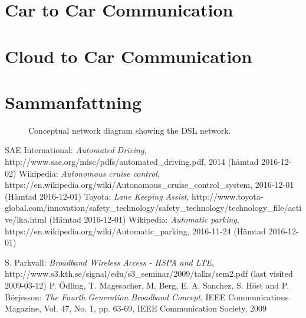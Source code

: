 \documentclass[a4paper]{IEEEtran}
\begin{document}
\section{Car to Car Communication}

\section{Cloud to Car Communication}

\section{Sammanfattning}



\begin{figure}
    \begin{center}
    \end{center}
    \caption{Conceptual network diagram showing the DSL network.}
    \label{DSLsetup}
\end{figure}




\begin{thebibliography}{77}
	SAE International: \emph{Automated Driving}, http://www.sae.org/misc/pdfs/automated\_driving.pdf, 2014 (hämtad 2016-12-02)
	Wikipedia: \emph{Autonomous cruise control}, https://en.wikipedia.org/wiki/Autonomous\_cruise\_control\_system, 2016-12-01 (Hämtad 2016-12-01)
	Toyota: \emph{Lane Keeping Assist}, 
	http://www.toyota-global.com/innovation/safety\_technology/safety\_technology/technology\_file/active/lka.html (Hämtad 2016-12-01)
	Wikipedia: \emph{Automatic parking}, https://en.wikipedia.org/wiki/Automatic\_parking, 2016-11-24 (Hämtad 2016-12-01)
	
	
S. Parkvall: \emph{Broadband Wireless Access - HSPA and LTE}, http://www.s3.kth.se/signal/edu/s3\_seminar/2009/talks/sem2.pdf (last visited 2009-03-12)
 P. Ödling, T. Magesacher, M. Berg, E. A. Sanchez, S. Höst and P. Börjesson: \emph{The Fourth Generation Broadband Concept}, IEEE Communications Magazine, Vol. 47, No. 1, pp. 63-69, IEEE Communication Society, 2009
\end{thebibliography}
\end{document}
